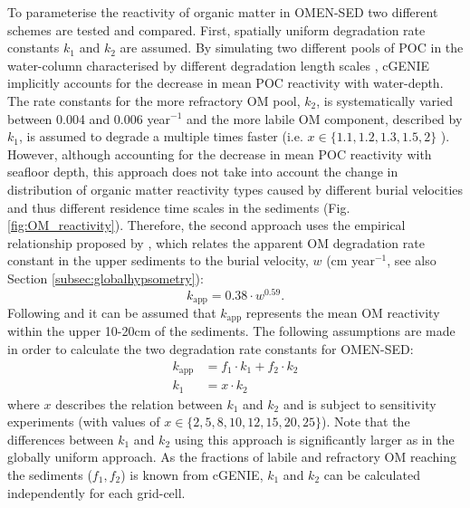 \documentclass[gmd, manuscript]{copernicus}
\begin{document}
To parameterise the reactivity of organic matter in OMEN-SED two different schemes are tested and compared. First, spatially uniform degradation rate constants $k_1$ and $k_2$ are assumed. 
By simulating two different pools of POC in the water-column characterised by different degradation length scales \citep{ridgwell_marine_2007}, cGENIE implicitly accounts for the decrease in mean POC reactivity with water-depth. 
The rate constants for the more refractory OM pool, $k_2$, is systematically varied between 0.004 and 0.006 year$^{-1}$ and the more labile OM component, described by $k_1$, is assumed to degrade a multiple times faster 
(i.e. $x \in \{1.1, 1.2, 1.3, 1.5, 2\}$ ). 
However, although accounting for the decrease in mean POC reactivity with seafloor depth, this approach does not take into account the change in distribution of organic matter reactivity types caused by different burial velocities 
and thus different residence time scales in the sediments (Fig. \ref{fig:OM_reactivity}). Therefore, the second approach uses the empirical relationship proposed by \citet{boudreau1997diagenetic}, 
which relates the apparent OM degradation rate constant in the upper sediments to the burial velocity, $w$ (cm year$^{-1}$, see also Section \ref{subsec:globalhypsometry}):
\begin{equation}
 k_\mathrm{app} = 0.38 \cdot w^{0.59}.
\end{equation}
Following \citet{boudreau1997diagenetic} and \citet{stolpovsky_toward_2015} it can be assumed that $k_\mathrm{app}$ represents the mean OM reactivity within the upper 10-20cm of the sediments. 
The following assumptions are made in order to calculate the two degradation rate constants for OMEN-SED:
\begin{align}
  k_\mathrm{app} &= f_1 \cdot k_1 + f_2 \cdot k_2 \label{boudreau_assumption1}\\
  k_1 &= x \cdot k_2					\label{boudreau_assumption2}
\end{align}
where $x$ describes the relation between $k_1$ and $k_2$ and is subject to sensitivity experiments (with values of $x \in \{2, 5, 8, 10, 12, 15, 20, 25\}$). 
Note that the differences between  $k_1$ and $k_2$ using this approach is significantly larger as in the globally uniform approach. 
As the fractions of labile and refractory OM reaching the sediments ($f_1, f_2$) is known from cGENIE, $k_1$ and $k_2$ can be calculated independently for each grid-cell. 
\end{document}
